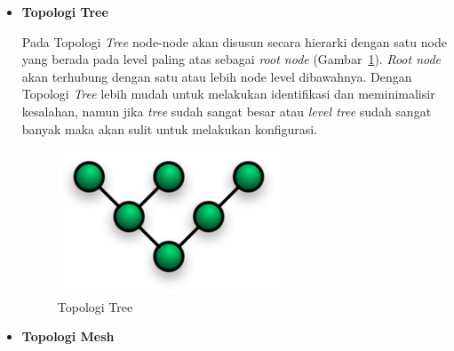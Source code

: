 \documentclass[a4paper,twoside]{article}
\begin{document}
\begin{enumerate}
\begin{itemize}
\begin{itemize}
\item \textbf{Topologi Tree}

Pada Topologi \textit{Tree} node-node akan disusun secara hierarki dengan satu node yang berada pada level paling atas sebagai \textit{root node} (Gambar~\ref{fig:tree}). \textit{Root node} akan terhubung dengan satu atau lebih node level dibawahnya. Dengan Topologi \textit{Tree} lebih mudah untuk melakukan identifikasi dan meminimalisir kesalahan, namun jika \textit{tree} sudah sangat besar atau \textit{level tree} sudah sangat banyak maka akan sulit untuk melakukan konfigurasi.
\begin{figure} [H]
	\centering  
	\includegraphics[scale=0.3]{Gambar/tree}  
	\caption[Topologi Tree]{Topologi Tree} 
	\label{fig:tree} 
\end{figure} 

\item \textbf{Topologi Mesh}


\end{itemize}
\end{itemize}
\end{enumerate}
\end{document}
